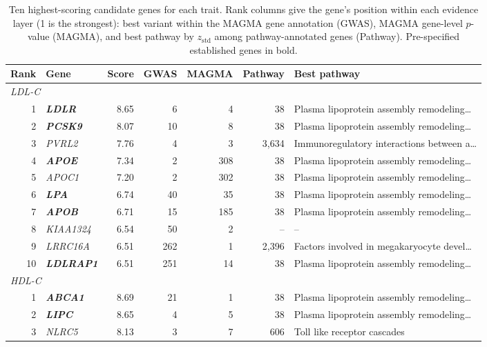 \begin{table}[!htbp]
\centering
\caption{Ten highest-scoring candidate genes for each trait. Rank columns give the gene's position within each evidence layer (1 is the strongest): best variant within the MAGMA gene annotation (GWAS), MAGMA gene-level $p$-value (MAGMA), and best pathway by $z_{\mathrm{std}}$ among pathway-annotated genes (Pathway). Pre-specified established genes in bold.}
\label{tab:lipid_candidates}
\small
\begin{tabular*}{\linewidth}{@{\extracolsep{\fill}}rlrrrrl}
\hline
\textbf{Rank} & \textbf{Gene} & \textbf{Score} & \textbf{GWAS} & \textbf{MAGMA} & \textbf{Pathway} & \textbf{Best pathway} \\
\hline
\multicolumn{7}{l}{\textit{LDL-C}} \\
1 & \textbf{\textit{LDLR}} & 8.65 & 6 & 4 & 38 & Plasma lipoprotein assembly remodeling\ldots \\
2 & \textbf{\textit{PCSK9}} & 8.07 & 10 & 8 & 38 & Plasma lipoprotein assembly remodeling\ldots \\
3 & \textit{PVRL2} & 7.76 & 4 & 3 & 3{,}634 & Immunoregulatory interactions between a\ldots \\
4 & \textbf{\textit{APOE}} & 7.34 & 2 & 308 & 38 & Plasma lipoprotein assembly remodeling\ldots \\
5 & \textit{APOC1} & 7.20 & 2 & 302 & 38 & Plasma lipoprotein assembly remodeling\ldots \\
6 & \textbf{\textit{LPA}} & 6.74 & 40 & 35 & 38 & Plasma lipoprotein assembly remodeling\ldots \\
7 & \textbf{\textit{APOB}} & 6.71 & 15 & 185 & 38 & Plasma lipoprotein assembly remodeling\ldots \\
8 & \textit{KIAA1324} & 6.54 & 50 & 2 & -- & -- \\
9 & \textit{LRRC16A} & 6.51 & 262 & 1 & 2{,}396 & Factors involved in megakaryocyte devel\ldots \\
10 & \textbf{\textit{LDLRAP1}} & 6.51 & 251 & 14 & 38 & Plasma lipoprotein assembly remodeling\ldots \\
\multicolumn{7}{l}{\textit{HDL-C}} \\
1 & \textbf{\textit{ABCA1}} & 8.69 & 21 & 1 & 38 & Plasma lipoprotein assembly remodeling\ldots \\
2 & \textbf{\textit{LIPC}} & 8.65 & 4 & 5 & 38 & Plasma lipoprotein assembly remodeling\ldots \\
3 & \textit{NLRC5} & 8.13 & 3 & 7 & 606 & Toll like receptor cascades \\

\end{tabular*}
\end{table}
